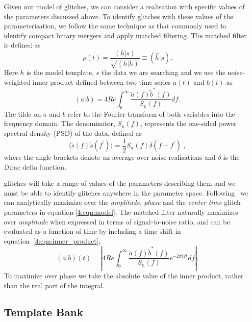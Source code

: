 Given our model of \scl{} glitches, we can consider a realisation with specific values of the parameters discussed above. To identify glitches with these values of the parameterisation, we follow the same technique as that commonly used to identify compact binary mergers and apply matched filtering. The matched filter is defined as~\cite{FINDCHIRP:2012}
%
\begin{equation}
  \rho(t) = \frac{(h | s)}{\sqrt{(h | h)}} \equiv (\hat{h} | s).
  \label{4:eqn:mf_1}
\end{equation}
%
Here $h$ is the model template, $s$ the \gw{} data we are searching and we use the noise-weighted inner product defined between two time series $a(t)$ and $b(t)$ as
%
\begin{equation}
  (a | b) = 4 Re \int^{\infty}_{0} \frac{\tilde{a}(f) \tilde{b}^*(f)}{S_n(f)} 
  df.
  \label{4:eqn:inner_product}
\end{equation}
%
The tilde on $\tilde{a}$ and $\tilde{b}$ refer to the Fourier-transform of both variables into the frequency domain. The denominator, $S_n(f)$, represents the one-sided power spectral density (PSD) of the data, defined as
%
\begin{equation}
  \langle \tilde{s}(f) \tilde{s}(f^\prime) \rangle = \frac{1}{2} S_n(f) \delta(f - f^\prime) \;,
  \label{4:eqn:psd}
\end{equation}
%
where the angle brackets denote an average over noise realisations and $\delta$ is the Dirac delta function.

\Scl{} glitches will take a range of values of the parameters describing them and we must be able to identify glitches anywhere in the parameter space. Following~\cite{FINDCHIRP:2012} we can analytically maximize over the \emph{amplitude}, \emph{phase} and the \emph{center time} glitch parameters in equation \ref{4:eqn:model}. The matched filter naturally maximizes over \emph{amplitude} when expressed in terms of signal-to-noise ratio, and can be evaluated as a function of time by including a time shift in equation~\ref{4:eqn:inner_product},
%
\begin{equation}
  (a | b)(t) = \left| 4 Re \int^{\infty}_{0} \frac{\tilde{a}(f) \tilde{b}^*(f)}{S_n(f)} 
  e^{-2 \pi i f t} 
  df \right|.
  \label{4:eqn:inner_product_time}
\end{equation}
%
To maximize over phase we take the absolute value of the inner product, rather than the real part of the integral.

\subsection{Template Bank}

